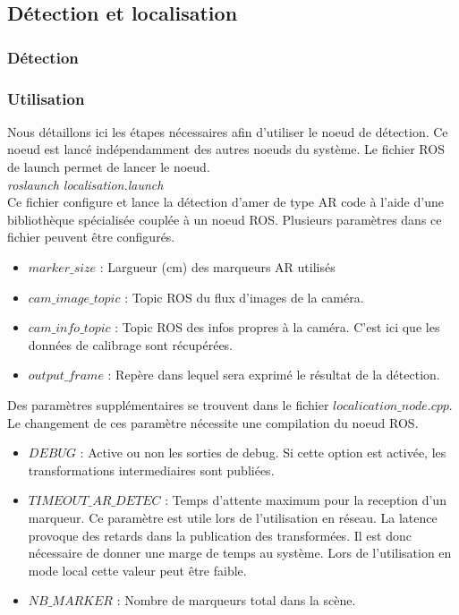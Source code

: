 \documentclass[10pt,a4paper]{article}
\begin{document}
\subsection{Détection et localisation}
\label{sec:detection_et_localisation}




\subsubsection{Détection}
\label{sec:detection}

\subsubsection*{Utilisation}

Nous détaillons ici les étapes nécessaires afin d'utiliser le noeud de détection. Ce noeud est lancé indépendamment des autres noeuds du système. 
Le fichier ROS de launch permet de lancer le noeud.\\
\textit{roslaunch localisation.launch}\\

Ce fichier configure et lance la détection d'amer de type AR code à l'aide d'une bibliothèque spécialisée couplée à un noeud ROS. 
Plusieurs paramètres dans ce fichier peuvent être configurés.
\begin{itemize}
\item $marker\_size$ : Largueur (cm) des marqueurs AR utilisés
\item $cam\_image\_topic$ : Topic ROS du flux d'images de la caméra.
\item $cam\_info\_topic$ : Topic ROS des infos propres à la caméra. C'est ici que les données de calibrage sont récupérées.
\item $output\_frame$ : Repère dans lequel sera exprimé le résultat de la détection.\\
\end{itemize}
Des paramètres supplémentaires se trouvent dans le fichier $localication\_node.cpp$. Le changement de ces paramètre nécessite une compilation du noeud ROS.
\begin{itemize}
\item $DEBUG$ : Active ou non les sorties de debug. Si cette option est activée, les transformations intermediaires sont publiées.
\item $TIMEOUT\_AR\_DETEC$ : Temps d'attente maximum pour la reception d'un marqueur. Ce paramètre est utile lors de l'utilisation en réseau. La latence provoque des retards dans la publication des transformées. Il est donc nécessaire de donner une marge de temps au système. Lors de l'utilisation en mode local cette valeur peut \^etre faible.
\item $NB\_MARKER$ : Nombre de marqueurs total dans la scène.\\
\end{itemize}
\end{document}
